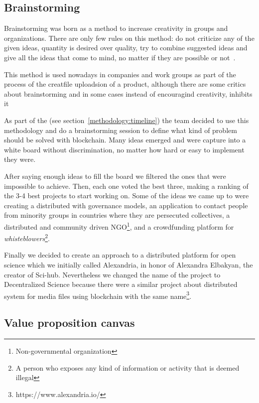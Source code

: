 \subsection{Brainstorming}

Brainstorming was born as a method to increase creativity in groups and
organizations. There are only few rules on this method: do not criticize any of
the given ideas, quantity is desired over quality, try to combine suggested
ideas and give all the ideas that come to mind, no matter if they are possible
or not~\cite{osborn1953applied}.

This method is used nowadays in companies and work groups as part of the process
of the creatfile uploadsion of a product, although there are some critics about
brainstorming and in some cases instead of encouragind creativity, inhibits
it~\cite{sutton1996brainstorming,mullen1991productivity}

As part of the (see section~\ref{methodology:timeline}) the team
decided to use this methodology and do a brainstorming session to define what
kind of problem should be solved with blockchain. Many ideas emerged and were
capture into a white board without discrimination, no matter how hard or easy to
implement they were.

After saying enough ideas to fill the board we filtered the ones that were
impossible to achieve. Then, each one voted the best three, making a ranking of
the 3-4 best projects to start working on. Some of the ideas we came up to were
creating a distributed  with governance models, an application to
contact people from minority groups in countries where they are persecuted
collectives, a distributed and community driven NGO\footnote{Non-governmental
  organization}, and a crowdfunding platform for \emph{whisteblowers}\footnote{A
  person who exposes any kind of information or activity that is deemed
  illegal}.

Finally we decided to create an approach to a distributed platform for open
science which we initially called Alexandria, in honor of Alexandra Elbakyan,
the creator of Sci-hub. Nevertheless we changed the name of the project to
Decentralized Science because there were a similar project about distributed
system for media files using blockchain with the same
name\footnote{https://www.alexandria.io/}.

\subsection{Value proposition canvas}
\label{sec:value-prop-canv}


